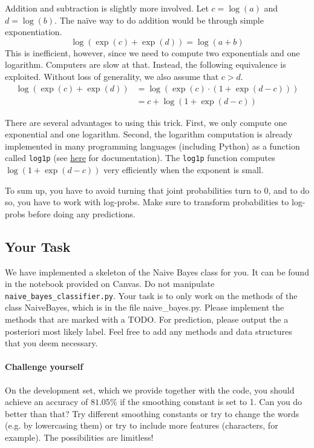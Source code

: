 \documentclass[11pt, a4paper]{article}
\begin{document}
Addition and subtraction is slightly more involved. Let $ c = \log(a) $ and $ d = \log(b) $. The na\"ive way to do addition would be through simple exponentiation.
\begin{equation*}
\log(\exp(c) + \exp(d)) = \log(a + b)
\end{equation*}
This is inefficient, however, since we need to compute two exponentials and one logarithm. Computers are slow at that. Instead, the 
following equivalence is exploited. Without loss of generality, we also assume that $ c > d $.
\begin{align*}
\log(\exp(c) + \exp(d)) &= \log(\exp(c) \cdot (1 + \exp(d-c)))  \\
&= c + \log(1 + \exp(d-c)) 
\end{align*}

There are several advantages to using this trick. First, we only compute one exponential and one logarithm. Second, the logarithm computation is already 
implemented in many programming languages (including Python) as a function called \texttt{log1p} (see \href{https://docs.python.org/3/library/math.html}{here} for documentation). The \texttt{log1p} function computes $ \log(1 + \exp(d-c)) $ very efficiently when the exponent is small.

To sum up, you have to avoid turning that joint probabilities turn to 0, and to do so, you have to work with log-probs. Make sure to transform probabilities to log-probs before doing any predictions.

\subsection{Your Task}
We have implemented a skeleton of the Naive Bayes class for you. It can be found in the notebook provided on Canvas. Do not manipulate \texttt{naive\_bayes\_classifier.py}. Your task is to only work on the methods of the class NaiveBayes, which is in the file naive\_bayes.py. Please implement the methods that are marked with a TODO. For prediction, please output the 
a posteriori most likely label. Feel free to add any methods and data structures that you deem necessary.

\paragraph{Challenge yourself} On the development set, which we provide together with the code, you
should achieve an accuracy of $ 81.05\% $ if the smoothing constant is set to 1. Can you do better
than that? Try different smoothing constants or try to change the words (e.g. by lowercasing them) or
try to include more features (characters, for example). The possibilities are limitless! 
\end{document}
